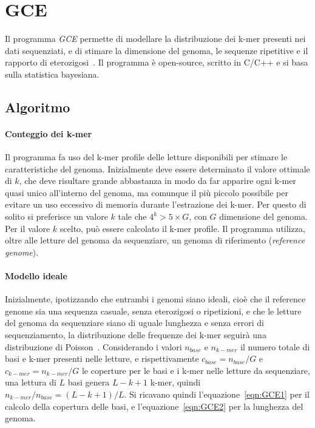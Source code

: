 \documentclass[crop=false, class=book]{standalone}
\begin{document}
	\section{GCE}
	Il programma \textit{GCE} permette di modellare la distribuzione dei k-mer presenti nei dati sequenziati, e di stimare la dimensione del genoma, le sequenze ripetitive e il rapporto di eterozigosi~\cite{liu2013GCE}. Il programma è open-source, scritto in C/C++ e si basa sulla statistica bayesiana.
	
	\subsection{Algoritmo}
	\paragraph{Conteggio dei k-mer}
	Il programma fa uso del k-mer profile delle letture disponibili per stimare le caratteristiche del genoma. Inizialmente deve essere determinato il valore ottimale di $k$, che deve risultare grande abbastanza in modo da far apparire ogni k-mer quasi unico all'interno del genoma, ma comunque il più piccolo possibile per evitare un uso eccessivo di memoria durante l'estrazione dei k-mer. Per questo di solito si preferisce un valore $k$ tale che $4^k>5 \times G$, con $G$ dimensione del genoma. Per il valore $k$ scelto, può essere calcolato il k-mer profile.
	Il programma utilizza, oltre alle letture del genoma da sequenziare, un genoma di riferimento (\textit{reference genome}).
	
	\paragraph{Modello ideale}
	Inizialmente, ipotizzando che entrambi i genomi siano ideali, cioè che il reference genome sia una sequenza casuale, senza eterozigosi o ripetizioni, e che le letture del genoma da sequenziare siano di uguale lunghezza e senza errori di sequenziamento, la distribuzione delle frequenze dei k-mer seguirà una distribuzione di Poisson~\cite{li2003estimating}. Considerando i valori $n_{base}$ e $n_{k-mer}$ il numero totale di basi e k-mer presenti nelle letture, e rispettivamente $c_{base} = n_{base}/G$ e $c_{k-mer} = n_{k-mer}/G$ le coperture per le basi e i k-mer nelle letture da sequenziare, una lettura di $L$ basi genera $L-k+1$ k-mer, quindi $n_{k-mer} / n_{base} = (L-k+1)/L$. Si ricavano quindi l'equazione~\vref{eqn:GCE1} per il calcolo della copertura delle basi, e l'equazione~\vref{eqn:GCE2} per la lunghezza del genoma.
	
\end{document}
